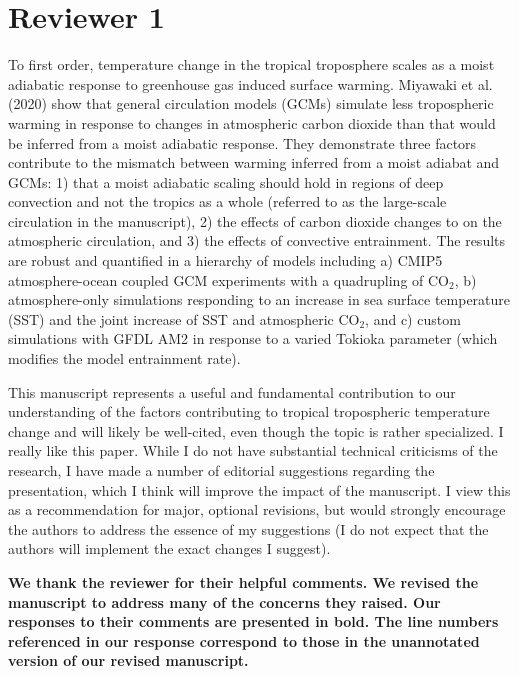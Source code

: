 \documentclass[11pt]{article}
\date{}
\title{}
\begin{document}
\section*{Reviewer 1}
\label{sec:orge3b49b1}
To first order, temperature change in the tropical troposphere scales as a moist adiabatic response to greenhouse gas induced surface warming. Miyawaki et al. (2020) show that general circulation models (GCMs) simulate less tropospheric warming in response to changes in atmospheric carbon dioxide than that would be inferred from a moist adiabatic response. They demonstrate three factors contribute to the mismatch between warming inferred from a moist adiabat and GCMs: 1) that a moist adiabatic scaling should hold in regions of deep convection and not the tropics as a whole (referred to as the large-scale circulation in the manuscript), 2) the effects of carbon dioxide changes to on the atmospheric circulation, and 3) the effects of convective entrainment. The results are robust and quantified in a hierarchy of models including a) CMIP5 atmosphere-ocean coupled GCM experiments with a quadrupling of CO\(_2\), b) atmosphere-only simulations responding to an increase in sea surface temperature (SST) and the joint increase of SST and atmospheric CO\(_2\), and c) custom simulations with GFDL AM2 in response to a varied Tokioka parameter (which modifies the model entrainment rate).

This manuscript represents a useful and fundamental contribution to our understanding of the factors contributing to tropical tropospheric temperature change and will likely be well-cited, even though the topic is rather specialized. I really like this paper. While I do not have substantial technical criticisms of the research, I have made a number of editorial suggestions regarding the presentation, which I think will improve the impact of the manuscript. I view this as a recommendation for major, optional revisions, but would strongly encourage the authors to address the essence of my suggestions (I do not expect that the authors will implement the exact changes I suggest).

\textbf{We thank the reviewer for their helpful comments. We revised the manuscript to address many of the concerns they raised. Our responses to their comments are presented in bold. The line numbers referenced in our response correspond to those in the unannotated version of our revised manuscript.}
\end{document}
